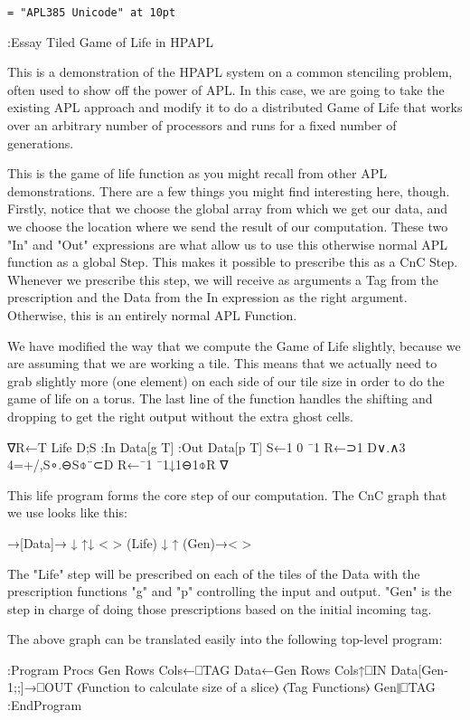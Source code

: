 
\font\tt = "APL385 Unicode" at 10pt

\verbatim
:Essay Tiled Game of Life in HPAPL

This is a demonstration of the HPAPL system on a common stenciling problem, 
often used to show off the power of APL.  In this case, we are going to take 
the existing APL approach and modify it to do a distributed Game of Life 
that works over an arbitrary number of processors and runs for a fixed number 
of generations.

This is the game of life function as you might recall from other APL 
demonstrations.  There are a few things you might find interesting here, 
though.  Firstly, notice that we choose the global array from which we 
get our data, and we choose the location where we send the result of our 
computation.  These two "In" and "Out" expressions are what allow us to use 
this otherwise normal APL function as a global Step.  This makes it possible 
to prescribe this as a CnC Step.  Whenever we prescribe this step, we will 
receive as arguments a Tag from the prescription and the Data from the In 
expression as the right argument.  Otherwise, this is an entirely normal 
APL Function.

We have modified the way that we compute the Game of Life slightly, because 
we are assuming that we are working a tile.  This means that we actually need 
to grab slightly more (one element) on each side of our tile size in order 
to do the game of life on a torus.  The last line of the function handles 
the shifting and dropping to get the right output without the extra ghost 
cells. 

∇R←T Life D;S
 :In Data[g T] :Out Data[p T]
 S←1 0 ¯1
 R←⊃1 D∨.∧3 4=+/,S∘.⊖S⌽¨⊂D
 R←¯1 ¯1↓1⊖1⌽R
∇

This life program forms the core step of our computation.  The CnC graph 
that we use looks like this:

      →[Data]→
    ↓    ↑↓
   < > (Life)
    ↓    ↑
  (Gen)→< >

The "Life" step will be prescribed on each of the tiles of the Data 
with the prescription functions "g" and "p" controlling the input and 
output.  "Gen" is the step in charge of doing those prescriptions based on 
the initial incoming tag. 

The above graph can be translated easily into the following top-level program:

:Program
 Procs Gen Rows Cols←⎕TAG
 Data←Gen Rows Cols↑⎕IN
 Data[Gen-1;;]→⎕OUT
 ⟨Function to calculate size of a slice⟩
 ⟨Tag Functions⟩
 Gen∥⎕TAG
:EndProgram

